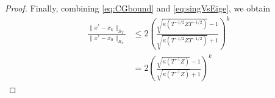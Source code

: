 \documentclass[10pt,a4paper]{amsart}
\begin{document}
\begin{proof}
    Finally, combining \eqref{eq:CGbound} and \eqref{eq:singVsEige}, we obtain
    \begin{equation}
        \begin{aligned}
            \frac{\|x^* - x_k \|_{B_T}}{\|x^* - x_0 \|_{B_T}} & \leq 2\left( \frac{\sqrt{\kappa(T^{-1/2}ZT^{-1/2})} -1}{\sqrt{\kappa(T^{-1/2}ZT^{-1/2})} +1} \right)^k \\
                                                              & = 2\left( \frac{\sqrt{\kappa(T^{-1}Z)} -1}{\sqrt{\kappa(T^{-1}Z)} +1} \right)^k
        \end{aligned}
    \end{equation}
\end{proof}
\end{document}
